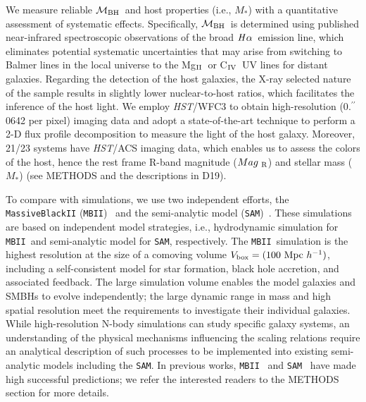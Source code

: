 \documentclass{natureprintstyle}
\newcommand{\hst}{{\it HST}}
\newcommand{\mbh}{$\mathcal M_{\rm BH}$}
\newcommand{\mr}{$Mag_{\rm ~R}$}
\newcommand{\halpha}{${\it H}\alpha$}
\newcommand{\mstar}{{$M_*$}}
\newcommand{\Mgii}{Mg$_{\rm II}$}
\newcommand{\Civ}{C$_{\rm IV}$}
\newcommand{\farcs}{\mbox{\ensuremath{.\!\!^{\prime\prime}}}}%
\newcommand{\sam}{\texttt{SAM}}
\newcommand{\mbii}{\texttt{MBII}}
\newcommand{\ding}[1]{\textcolor{red}{[{\bf Xuheng}: #1]}}
\begin{document}
We measure reliable \mbh\ and host properties (i.e., \mstar) with a quantitative assessment of systematic effects. Specifically, \mbh\ is determined using published near-infrared spectroscopic observations of the broad \halpha\ emission line, which eliminates potential systematic uncertainties that may arise from switching to Balmer lines in the local universe to the \Mgii\ or \Civ\ UV lines for distant galaxies. Regarding the detection of the host galaxies, the X-ray selected nature of the sample results in slightly lower nuclear-to-host ratios, which facilitates the inference of the host light. We employ \hst/WFC3 to obtain high-resolution (0\farcs0642 per pixel) imaging data and adopt a state-of-the-art technique to perform a 2-D flux profile decomposition to measure the light of the host galaxy. Moreover, 21/23 systems have \hst/ACS imaging data, which enables us to assess the colors of the host, hence the rest frame R-band magnitude (\mr) and stellar mass (\mstar) (see METHODS and the descriptions in D19). 


To compare with simulations, we use two independent efforts, the \texttt{MassiveBlackII} (\texttt{MBII})~\cite{Khandai2015} and the semi-analytic model (\texttt{SAM})~\cite{Menci2014}. These simulations are based on independent model strategies, i.e., hydrodynamic simulation for \mbii\ and semi-analytic model for \sam, respectively. The \mbii\ simulation is the highest resolution at the size of a comoving volume $V_{\rm box} = (100~{\rm Mpc}~h^{-1})$, including a self-consistent model for star formation, black hole accretion, and associated feedback. The large simulation volume enables the model galaxies and SMBHs to evolve independently; the large dynamic range in mass and high spatial resolution meet the requirements to investigate their individual galaxies. While high-resolution N-body simulations can study specific galaxy systems, an understanding of the physical mechanisms influencing the scaling relations require an analytical description of such processes to be implemented into existing semi-analytic models including the \sam. In previous works, \mbii~\cite{Huang2018, DeG++15, Khandai2015,Bhowmick2019} and \sam~\cite{Menci2014, Menci2016} have made high successful predictions; we refer the interested readers to the METHODS section for more details.
\end{document}
